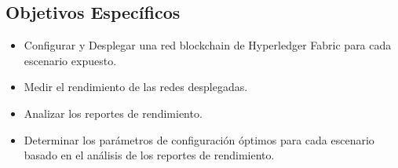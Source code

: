 \subsection{Objetivos Espec\'ificos}
\begin{itemize}
\item Configurar y Desplegar una red blockchain de Hyperledger Fabric para cada escenario expuesto.
\item Medir el rendimiento de las redes desplegadas.
\item Analizar los reportes de rendimiento.
\item Determinar los par\'ametros de configuraci\'on \'optimos para cada escenario basado en el an\'alisis de los reportes de rendimiento.
\end{itemize}

